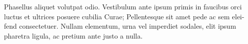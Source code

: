 Phasellus aliquet volutpat odio. Vestibulum ante ipsum primis in faucibus orci luctus et ultrices posuere cubilia Curae; Pellentesque sit amet pede ac sem elei- fend consectetuer. Nullam elementum, urna vel imperdiet sodales, elit ipsum pharetra ligula, ac pretium ante justo a nulla.